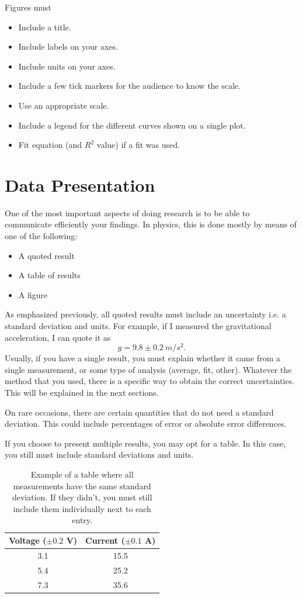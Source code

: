 \documentclass[12pt]{report}
\begin{document}
\noindent Figures must
\begin{itemize}
\item Include a title.
\item Include labels on your axes.
\item Include units on your axes.
\item Include a few tick markers for the audience to know the scale.
\item Use an appropriate scale.
\item Include a legend for the different curves shown on a single plot.
\item Fit equation (and $R^2$ value) if a fit was used.
\end{itemize}

\section{Data Presentation} \label{Sec:Data-presentation}
One of the most important aspects of doing research is to be able to communicate efficiently your findings. In physics, this is done mostly by means of one of the following:
\begin{itemize}
\item A quoted result
\item A table of results
\item A figure
\end{itemize}

As emphasized previously, all quoted results must include an uncertainty i.e. a standard deviation and units. For example, if I measured the gravitational acceleration, I can quote it as
\begin{equation}
g = 9.8 \pm 0.2 \ m/s^2.
\end{equation}
Usually, if you have a single result, you must explain whether it came from a single measurement, or some type of analysis (average, fit, other).
Whatever the method that you used, there is a specific way to obtain the correct uncertainties. This will be explained in the next sections.

On rare occasions, there are certain quantities that do not need a standard deviation. This could include percentages of error or absolute error differences.

If you choose to present multiple results, you may opt for a table. In this case, you still must include standard deviations and units.
\begin{table}[h]
\centering
\begin{tabular}{||c|c||}
\hline
Voltage ($\pm 0.2$ V) & Current ($\pm 0.1$ A) \\ \hline
3.1 & 15.5 \\
5.4 & 25.2 \\
7.3 & 35.6 \\ \hline
\end{tabular}
\caption{Example of a table where all measurements have the same standard deviation. If they didn't, you must still include them individually next to each entry.}
\label{Table:Presentation-Example}
\end{table}
\end{document}
